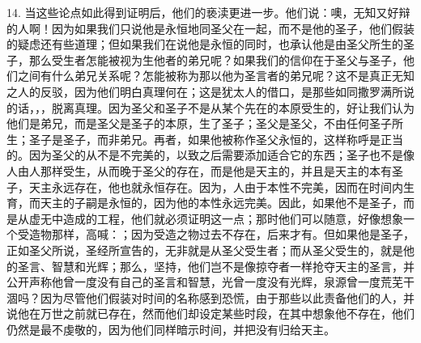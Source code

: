 14. 当这些论点如此得到证明后，他们的亵渎更进一步。他们说：噢，无知又好辩的人啊！因为如果我们只说他是永恒地同圣父在一起，而不是他的圣子，他们假装的疑虑还有些道理；但如果我们在说他是永恒的同时，也承认他是由圣父所生的圣子，那么受生者怎能被视为生他者的弟兄呢？如果我们的信仰在于圣父与圣子，他们之间有什么弟兄关系呢？怎能被称为那以他为圣言者的弟兄呢？这不是真正无知之人的反驳，因为他们明白真理何在；这是犹太人的借口，是那些如同撒罗满所说的话，，，脱离真理。因为圣父和圣子不是从某个先在的本原受生的，好让我们认为他们是弟兄，而是圣父是圣子的本原，生了圣子；圣父是圣父，不由任何圣子所生；圣子是圣子，而非弟兄。再者，如果他被称作圣父永恒的，这样称呼是正当的。因为圣父的从不是不完美的，以致之后需要添加适合它的东西；圣子也不是像人由人那样受生，从而晚于圣父的存在，而是他是天主的，并且是天主的本有圣子，天主永远存在，他也就永恒存在。因为，人由于本性不完美，因而在时间内生育，而天主的子嗣是永恒的，因为他的本性永远完美。因此，如果他不是圣子，而是从虚无中造成的工程，他们就必须证明这一点；那时他们可以随意，好像想象一个受造物那样，高喊：；因为受造之物过去不存在，后来才有。但如果他是圣子，正如圣父所说，圣经所宣告的，无非就是从圣父受生者；而从圣父受生的，就是他的圣言、智慧和光辉；那么，坚持，他们岂不是像掠夺者一样抢夺天主的圣言，并公开声称他曾一度没有自己的圣言和智慧，光曾一度没有光辉，泉源曾一度荒芜干涸吗？因为尽管他们假装对时间的名称感到恐慌，由于那些以此责备他们的人，并说他在万世之前就已存在，然而他们却设定某些时段，在其中想象他不存在，他们仍然是最不虔敬的，因为他们同样暗示时间，并把没有归给天主。\par


